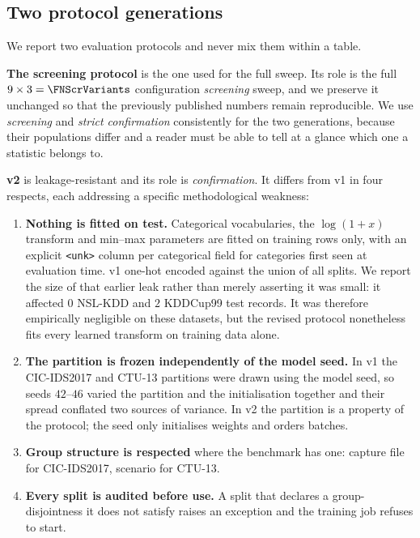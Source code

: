 \subsection{Two protocol generations}

We report two evaluation protocols and never mix them within a table.

\textbf{The screening protocol} is the one used for the full sweep. Its role is the full
$9\times3=\FNScrVariants$ configuration \emph{screening} sweep, and we preserve
it unchanged so that the previously published numbers remain reproducible. We
use \emph{screening} and \emph{strict confirmation} consistently for the two
generations, because their populations differ and a reader must be able to tell
at a glance which one a statistic belongs to.

\textbf{v2} is leakage-resistant and its role is \emph{confirmation}. It differs
from v1 in four respects, each addressing a specific methodological weakness:

\begin{enumerate}
  \item \textbf{Nothing is fitted on test.} Categorical vocabularies, the
        $\log(1+x)$ transform and min--max parameters are fitted on training
        rows only, with an explicit \texttt{<unk>} column per categorical field
        for categories first seen at evaluation time. v1 one-hot encoded against
        the union of all splits. We report the size of that earlier leak rather
        than merely asserting it was small: it affected $0$ NSL-KDD and $2$
        KDDCup99 test records. It was therefore empirically negligible on these
        datasets, but the revised protocol nonetheless fits every learned
        transform on training data alone.
  \item \textbf{The partition is frozen independently of the model seed.} In v1
        the CIC-IDS2017 and CTU-13 partitions were drawn using the model seed,
        so seeds $42$--$46$ varied the partition and the initialisation
        together and their spread conflated two sources of variance. In v2 the
        partition is a property of the protocol; the seed only initialises
        weights and orders batches.
  \item \textbf{Group structure is respected} where the benchmark has one:
        capture file for CIC-IDS2017, scenario for CTU-13.
  \item \textbf{Every split is audited before use.} A split that declares a
        group-disjointness it does not satisfy raises an exception and the
        training job refuses to start.
\end{enumerate}

